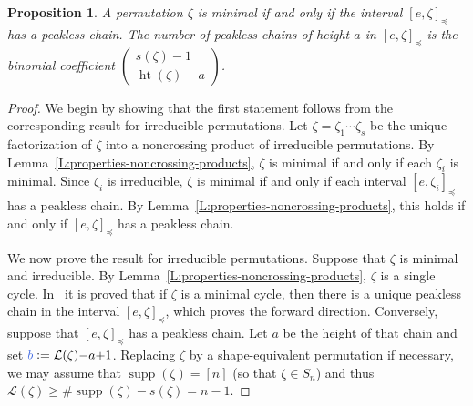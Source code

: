 \documentclass[12pt,oneside,reqno]{amsart}
\newtheorem{proposition}[theorem]{Proposition}
\theoremstyle{definition}
\numberwithin{equation}{section}
\newcommand{\calL}{{\mathcal L}}
\DeclareMathOperator{\het}{ht}
\DeclareMathOperator{\supp}{supp}
\newcommand{\defcolor}[1]{{\color{RoyalBlue}#1}}
\begin{document}
\begin{proposition}\label{P:peaklessChains}
 A permutation $\zeta$ is minimal if and only if the interval $[e,\zeta]_\preceq$ has a peakless chain.
 The number of peakless chains of height $a$ in $[e,\zeta]_\preceq$ is the binomial coefficient
 $\left(\begin{smallmatrix} s(\zeta)-1 \\ \het(\zeta)-a \end{smallmatrix}\right)$.
\end{proposition}
\begin{proof}
    We begin by showing that the first statement follows from the corresponding
    result for irreducible permutations.
    Let $\zeta=\zeta_1\dotsb \zeta_s$ be the unique
    factorization of $\zeta$ into a noncrossing product of irreducible permutations.
    By Lemma~\ref{L:properties-noncrossing-products},
    $\zeta$ is minimal if and only if each $\zeta_i$ is minimal.
    Since $\zeta_i$ is irreducible,
    $\zeta$ is minimal if and only if each interval $[e, \zeta_i]_{\preceq}$ has
    a peakless chain.
    By Lemma~\ref{L:properties-noncrossing-products},
    this holds if and only if $[e, \zeta]_{\preceq}$ has a peakless chain.

We now prove the result for irreducible permutations.
Suppose that $\zeta$ is minimal and irreducible.
By Lemma~\ref{L:properties-noncrossing-products}, $\zeta$ is a single cycle.
In~\cite[Lem.~6.7]{BS-iso} it is proved that if $\zeta$ is a minimal cycle,
then there is a unique peakless chain in the interval $[e, \zeta]_\preceq$,
which proves the forward direction.
Conversely, suppose that $[e, \zeta]_\preceq$ has a peakless chain.
Let \defcolor{$a$} be the height of that chain and set
$\defcolor{b}\vcentcolon=\calL(\zeta){-}a{+}1$.
Replacing $\zeta$ by a shape-equivalent permutation if necessary, we may assume
that $\supp(\zeta)=[n]$ (so that $\zeta\in S_n$) and thus $\calL(\zeta) \geq
\#\supp(\zeta) - s(\zeta) = n-1$.


\end{proof}
\end{document}
